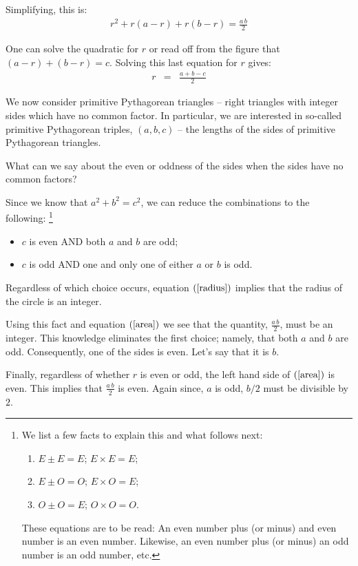 \documentclass[12pt]{article}
\begin{document}
Simplifying, this is:
\begin{eqnarray}
r^2 + r(a - r) + r(b-r) = \frac{a\, b}{2} \label{area} 
\end{eqnarray}

One can solve the quadratic for $r$ or read off from the figure 
that $(a-r) + (b-r) = c$. Solving this last equation for $r$ gives:
\begin{eqnarray}
  r & = & \frac{a + b - c}{2} \label{radius}
\end{eqnarray}

We now consider primitive Pythagorean triangles -- right 
triangles with integer sides which have no common factor.
In particular, we are interested in so-called primitive Pythagorean triples,
$(a,b,c)$ -- the lengths of the sides of primitive Pythagorean triangles.

What can we say about the even or oddness of the sides when the sides have no 
common factors? 

Since we know that $a^2 + b^2 = c^2$, we can reduce the combinations to 
the following:%
\footnote{We list a few facts to explain this and what follows next:
\begin{enumerate}
    \item{$E \pm E = E$; $ E \times E = E$;}
    \item{$E \pm O = O$; $ E \times O = E$;}
    \item{$O \pm O = E$; $ O \times O = O$.}
\end{enumerate}
These equations are to be read: An even number plus (or minus) and even number 
is an even number.
Likewise, an even number plus (or minus) an odd number is an odd number, etc.
}
\begin{itemize}
  \item{$c$ is even AND both $a$ and $b$ are odd;}
  \item{$c$ is odd AND one and only one of either $a$ or $b$ is odd.}
\end{itemize}

Regardless of which choice occurs, equation $(\ref{radius})$ implies that 
the radius of the circle is an integer.%

Using this fact and equation $(\ref{area})$ we see that the quantity, 
$\frac{a \, b}{2}$, must be an integer. 
This knowledge eliminates the first choice; namely, that both $a$ and $b$ 
are odd. Consequently, one of the sides
is even. Let's say that it is $b$.

Finally, regardless of whether $r$ is even or odd, the left hand side of 
$(\ref{area})$ is even. This implies that $\frac{a \, b}{2}$
is even. Again since, $a$ is odd, $b/2$ must be divisible by $2$.
\end{document}
